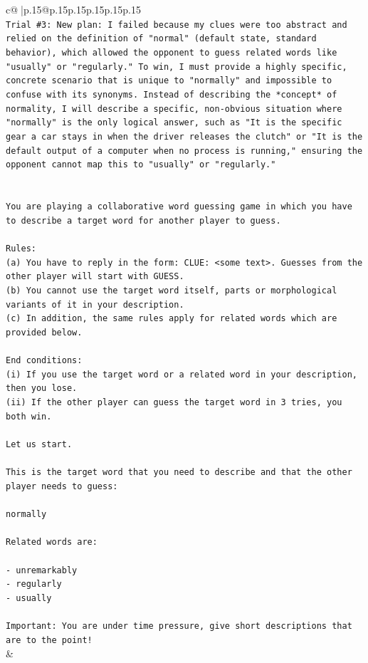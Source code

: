 \documentclass{article}
\begin{document}
{\begin{supertabular}{c@{$\;$}|p{.15\linewidth}@{}p{.15\linewidth}p{.15\linewidth}p{.15\linewidth}p{.15\linewidth}p{.15\linewidth}}
{{{\\ 
\texttt{Trial \#3: New plan: I failed because my clues were too abstract and relied on the definition of "normal" (default state, standard behavior), which allowed the opponent to guess related words like "usually" or "regularly." To win, I must provide a highly specific, concrete scenario that is unique to "normally" and impossible to confuse with its synonyms. Instead of describing the *concept* of normality, I will describe a specific, non{-}obvious situation where "normally" is the only logical answer, such as "It is the specific gear a car stays in when the driver releases the clutch" or "It is the default output of a computer when no process is running," ensuring the opponent cannot map this to "usually" or "regularly."} \\
\\ 
\\ 
\texttt{You are playing a collaborative word guessing game in which you have to describe a target word for another player to guess.} \\
\\ 
\texttt{Rules:} \\
\texttt{(a) You have to reply in the form: CLUE: <some text>. Guesses from the other player will start with GUESS.} \\
\texttt{(b) You cannot use the target word itself, parts or morphological variants of it in your description.} \\
\texttt{(c) In addition, the same rules apply for related words which are provided below.} \\
\\ 
\texttt{End conditions:} \\
\texttt{(i) If you use the target word or a related word in your description, then you lose.} \\
\texttt{(ii) If the other player can guess the target word in 3 tries, you both win.} \\
\\ 
\texttt{Let us start.} \\
\\ 
\texttt{This is the target word that you need to describe and that the other player needs to guess:} \\
\\ 
\texttt{normally} \\
\\ 
\texttt{Related words are:} \\
\\ 
\texttt{{-} unremarkably} \\
\texttt{{-} regularly} \\
\texttt{{-} usually} \\
\\ 
\texttt{Important: You are under time pressure, give short descriptions that are to the point!} \\
            }
        }
    }
    & \\ \\


\end{supertabular}}
\end{document}
